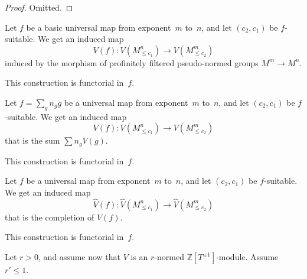 \begin{proof}
  \leanok
  Omitted.
\end{proof}

\begin{definition}
  \label{basic_eval_LCFP}
  \leanok
  Let $f$ be a basic universal map from exponent~$m$ to~$n$,
  and let $(c_2, c_1)$ be $f$-suitable.
  We get an induced map
  \[
    V(f) \colon V(M_{\le c_1}^n) \to V(M_{\le c_2}^m)
  \]
  induced by the morphism of profinitely filtered pseudo-normed groups $M^m \to M^n$.

  This construction is functorial in~$f$.
\end{definition}

\begin{definition}
  \label{eval_LCFP}
  \leanok
  Let $f = \sum_g n_g g$ be a universal map from exponent~$m$ to~$n$,
  and let $(c_2, c_1)$ be $f$-suitable.
  We get an induced map
  \[
    V(f) \colon V(M_{\le c_1}^n) \to V(M_{\le c_2}^m)
  \]
  that is the sum $\sum n_g V(g)$.

  This construction is functorial in~$f$.
\end{definition}

\begin{definition}
  \label{eval_CLCFP}
  \leanok
  Let $f$ be a universal map from exponent~$m$ to~$n$,
  and let $(c_2, c_1)$ be $f$-suitable.
  We get an induced map
  \[
    \hat V(f) \colon \hat V(M_{\le c_1}^n) \to \hat V(M_{\le c_2}^m)
  \]
  that is the completion of $V(f)$.

  This construction is functorial in~$f$.
\end{definition}

Let $r > 0$, and assume now that $V$ is an $r$-normed $\mathbb Z[T^{\pm 1}]$-module.
Assume $r' \le 1$.

